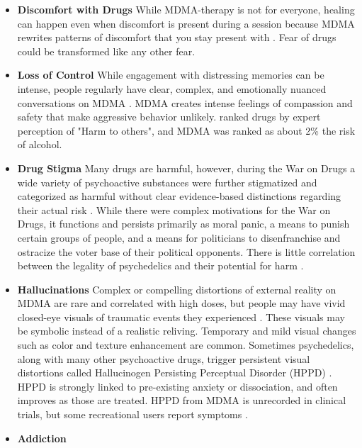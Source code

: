 \documentclass[12pt,letterpaper]{article}
\begin{document}
\begin{itemize}
    \item \textbf{Discomfort with Drugs}
     While MDMA-therapy is not for everyone, healing can happen even when discomfort is present during a session because MDMA rewrites patterns of discomfort that you stay present with \cite{fedduciaMDMAMemoryReconsolidation}. Fear of drugs could be transformed like any other fear.
    \item \textbf{Loss of Control}
        While engagement with distressing memories can be intense, people regularly have clear, complex, and emotionally nuanced conversations on MDMA \cite{colbertEvenings,passieHistory}. MDMA creates intense feelings of compassion and safety that make aggressive behavior unlikely. \textcite{nuttDrugHarms} ranked drugs by expert perception of "Harm to others", and MDMA was ranked as about 2\% the risk of alcohol.
    \item \textbf{Drug Stigma}
        Many drugs are harmful, however, during the War on Drugs a wide variety of psychoactive substances were further stigmatized and categorized as harmful without clear evidence-based distinctions regarding their actual risk \cite{alexanderNewJimCrow,nuttDrugHarms}. While there were complex motivations for the War on Drugs, it functions and persists primarily as moral panic, a means to punish certain groups of people, and a means for politicians to disenfranchise and ostracize the voter base of their political opponents. There is little correlation between the legality of psychedelics and their potential for harm \cite{nuttDrugHarms}.
    \item \textbf{Hallucinations}
        Complex or compelling distortions of external reality on MDMA are rare and correlated with high doses, but people may have vivid closed-eye visuals of traumatic events they experienced \cite{liechtiGender}. These visuals may be symbolic instead of a realistic reliving. Temporary and mild visual changes such as color and texture enhancement are common. Sometimes psychedelics, along with many other psychoactive drugs, trigger persistent visual distortions called Hallucinogen Persisting Perceptual Disorder (HPPD) \cite{alexanderHPPD,halpernHPPD}. HPPD is strongly linked to pre-existing anxiety or dissociation, and often improves as those are treated. HPPD from MDMA is unrecorded in clinical trials, but some recreational users report symptoms \cite{vizeliActuteEffects,litjensHPPD}.
    \item \textbf{Addiction}

\end{itemize}
\end{document}
